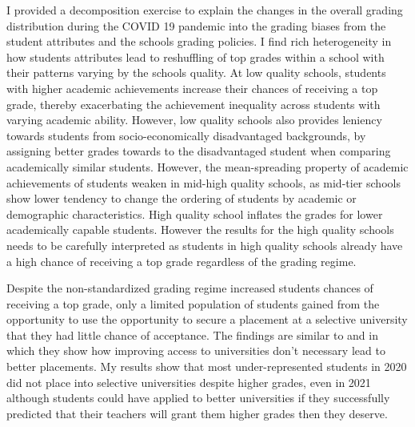 I provided a decomposition exercise to explain the changes in the overall grading distribution during the COVID 19 pandemic into the grading biases from the student attributes and the schools grading policies. I find rich heterogeneity in how students attributes lead to reshuffling of top grades within a school with their patterns varying by the schools quality. At low quality schools, students with higher academic achievements increase their chances of receiving a top grade, thereby exacerbating the  achievement inequality across students with varying academic ability. However, low quality schools also provides leniency towards students from socio-economically disadvantaged backgrounds, by assigning better grades towards to the disadvantaged student when comparing academically similar students. However, the mean-spreading property of academic achievements of students weaken in mid-high quality schools, as mid-tier schools show lower tendency to change the ordering of students by academic or demographic characteristics. High quality school inflates the grades for lower academically capable students. However the results for the high quality schools needs to be carefully interpreted as students in high quality schools already have a high chance of receiving a top grade regardless of the grading regime. 

Despite the non-standardized grading regime increased students chances of receiving a top grade, only a limited population of students gained from the opportunity to use the opportunity to secure a placement at a selective university that they had little chance of acceptance. The findings are similar to \cite{dee2019} and \cite{10.1257/pol.20200515} in which they show how improving access to universities don't necessary lead to better placements. My results show that most under-represented students in 2020 did not place into selective universities despite higher grades, even in 2021 although students could have applied to better universities if they successfully predicted that their teachers will grant them higher grades then they deserve. 
